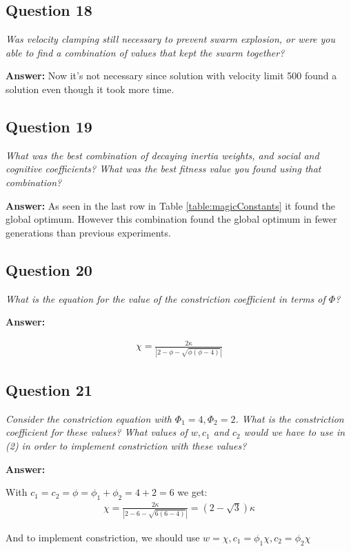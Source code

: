 \documentclass[a4paper]{article}
\begin{document}
\subsection*{Question 18}
\emph{Was velocity clamping still necessary to prevent swarm explosion, or were you able to find a combination of values that kept the swarm together?} 

\textbf{Answer:} Now it's not necessary since solution with velocity limit 500 found a solution even though it took more time.

\subsection*{Question 19}
\emph{What was the best combination of decaying inertia weights, and social and cognitive coefficients? What was the best fitness value you found using that combination?}

\textbf{Answer:} As seen in the last row in Table \ref{table:magicConstants} it found the global optimum. However this combination found the global optimum in fewer generations than previous experiments. 

\subsection*{Question 20}
\emph{What is the equation for the value of the constriction coefficient
in terms of $\Phi$?}

\textbf{Answer:}

\begin{align*}
\chi = \frac{2\kappa}{|2-\phi-\sqrt{\phi(\phi-4)}|}
\end{align*}


\subsection*{Question 21}
\emph{Consider the constriction equation with $\Phi_1 = 4, \Phi_2 = 2$. What is
the constriction coefficient for these values? What values of $w, c_1$ and
$c_2$ would we have to use in (2) in order to implement constriction with these
values?}

\textbf{Answer:}

With $c_1 = c_2 = \phi = \phi_1 + \phi_2 = 4 + 2 = 6$ we get:
\begin{align*}
\chi = \frac{2\kappa}{|2-6-\sqrt{6(6-4)}|} = (2-\sqrt{3})\kappa
\end{align*}

And to implement constriction, we should use $w = \chi, c_1 = \phi_1\chi, c_2 = \phi_2\chi$
\end{document}
